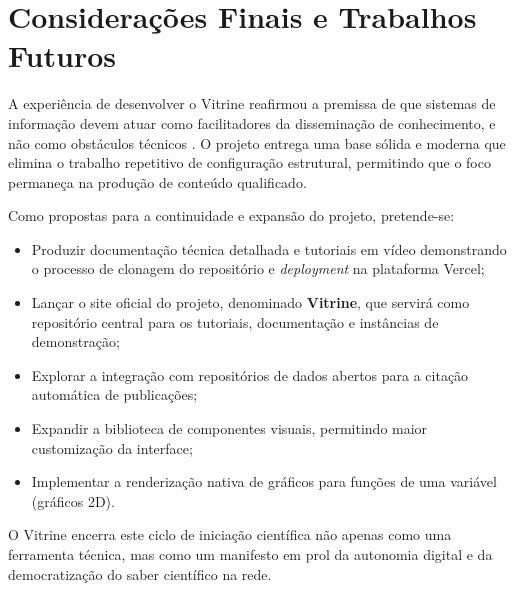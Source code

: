 \section{Considerações Finais e Trabalhos Futuros}

A experiência de desenvolver o Vitrine reafirmou a premissa de que sistemas de informação devem atuar como facilitadores da disseminação de conhecimento, e não como obstáculos técnicos \cite{KeRainerJr2019}. O projeto entrega uma base sólida e moderna que elimina o trabalho repetitivo de configuração estrutural, permitindo que o foco permaneça na produção de conteúdo qualificado.

Como propostas para a continuidade e expansão do projeto, pretende-se:
\begin{itemize}
    \item Produzir documentação técnica detalhada e tutoriais em vídeo demonstrando o processo de clonagem do repositório e \textit{deployment} na plataforma Vercel;
    \item Lançar o site oficial do projeto, denominado \textbf{Vitrine}, que servirá como repositório central para os tutoriais, documentação e instâncias de demonstração;
    \item Explorar a integração com repositórios de dados abertos para a citação automática de publicações;
    \item Expandir a biblioteca de componentes visuais, permitindo maior customização da interface;
    \item Implementar a renderização nativa de gráficos para funções de uma variável (gráficos 2D).
\end{itemize}

O Vitrine encerra este ciclo de iniciação científica não apenas como uma ferramenta técnica, mas como um manifesto em prol da autonomia digital e da democratização do saber científico na rede.